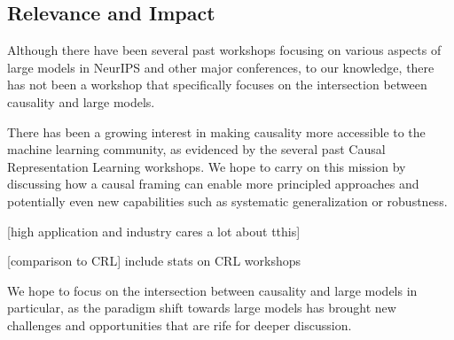 \documentclass{article}
\begin{document}




\subsection{Relevance and Impact}

Although there have been several past workshops focusing on various aspects of large models in NeurIPS and other major conferences, to our knowledge, there has not been a workshop that specifically focuses on the intersection between causality and large models.

There has been a growing interest in making causality more accessible to the machine learning community, as evidenced by the several past Causal Representation Learning workshops. We hope to carry on this mission by discussing how a causal framing can enable more principled approaches and potentially even new capabilities such as systematic generalization or robustness.

[high application and industry cares a lot about tthis]

[comparison to CRL] include stats on CRL workshops


We hope to focus on the intersection between causality and large models in particular, as the paradigm shift towards large models has brought new challenges and opportunities that are rife for deeper discussion.


% 


\end{document}
